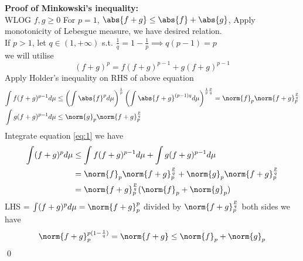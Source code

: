 \textbf{Proof of Minkowski's inequality:} \\
\pf WLOG $f,g\geq 0$
For $p=1$, $\abs{f+g} \leq \abs{f}+\abs{g}$, Apply monotonicity of Lebesgue measure, we have desired relation. \\
If $p > 1$, let $q\in (1,+\infty)$ s.t. $\frac{1}{q} = 1- \frac{1}{p} \implies q(p-1) = p$ \\
we will utilise 
\begin{equation}\label{eq:1}
    (f+g)^p = f(f+g)^{p-1} + g(f+g)^{p-1}
\end{equation}
Apply Holder's inequality on RHS of above equation
\begin{align*}
    \int f(f+g)^{p-1} d\mu &\leq \left(\int \abs{f}^p  d\mu\right)^{\frac{1}{p}} \left(\int \abs{f+g}^{(p-1)q} d\mu\right)^{{\frac{1}{p}}{\frac{p}{q}}} = \norm{f}_p\norm{f+g}_p^{\frac{p}{q}} \\
    \int g(f+g)^{p-1} d\mu &\leq \norm{g}_p\norm{f+g}_p^{\frac{p}{q}}
\end{align*}
Integrate equation \ref{eq:1} we have 
\begin{align*}
    \int(f+g)^p d\mu &\leq \int f(f+g)^{p-1} d\mu + \int g(f+g)^{p-1} d\mu \\
    &= \norm{f}_p\norm{f+g}_p^{\frac{p}{q}} +\norm{g}_p\norm{f+g}_p^{\frac{p}{q}} \\
    &= \norm{f+g}_p^{\frac{p}{q}}(\norm{f}_p+\norm{g}_p)
\end{align*}LHS = $\int(f+g)^p d\mu = \norm{f+g}_p^p$ divided by $\norm{f+g}_p^{\frac{p}{q}}$ both sides we have
\begin{equation*}
    \norm{f+g}_p^{p(1-\frac{1}{q})} = \norm{f+g} \leq \norm{f}_p+\norm{g}_p
\end{equation*}
\qed